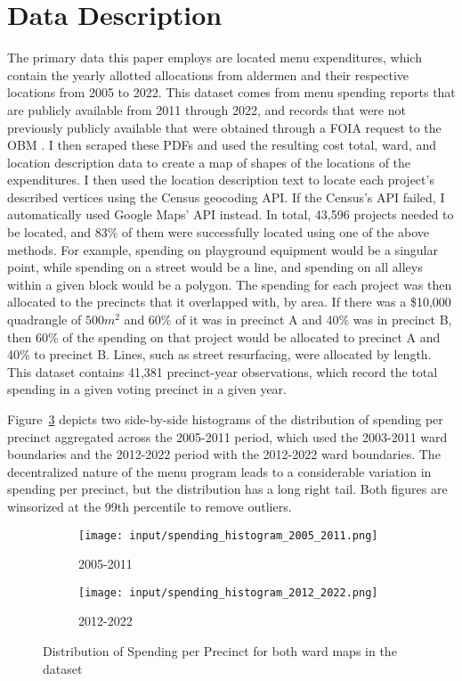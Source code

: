 \section{Data Description}\label{sec:data_description}
The primary data this paper employs are located menu expenditures, which contain the yearly allotted allocations from aldermen and their respective locations from 2005 to 2022.
This dataset comes from menu spending reports that are publicly available from 2011 through 2022, and records that were not previously publicly available that were obtained through a FOIA request to the OBM \cite{OBM_datasource}.  
I then scraped these PDFs and used the resulting cost total, ward, and location description data to create a map of shapes of the locations of the expenditures.
I then used the location description text to locate each project's described vertices using the Census geocoding API. 
If the Census's API failed, I automatically used Google Maps' API instead.
In total, 43,596 projects needed to be located, and 83\% of them were successfully located using one of the above methods.
For example, spending on playground equipment would be a singular point, while spending on a street would be a line, and spending on all alleys within a given block would be a polygon.
The spending for each project was then allocated to the precincts that it overlapped with, by area.
If there was a \$10,000 quadrangle of $500 m^2$ and 60\% of it was in precinct A and 40\% was in precinct B, then 60\% of the spending on that project would be allocated to precinct A and 40\% to precinct B.
Lines, such as street resurfacing, were allocated by length.
This dataset contains 41,381 precinct-year observations, which record the total spending in a given voting precinct in a given year.

Figure~\ref{fig:spending_hist} depicts two side-by-side histograms of the distribution of spending per precinct aggregated across the 2005-2011 period, which used the 2003-2011 ward boundaries and the 2012-2022 period with the 2012-2022 ward boundaries.
The decentralized nature of the menu program leads to a considerable variation in spending per precinct, but the distribution has a long right tail.
Both figures are winsorized at the 99th percentile to remove outliers.

\begin{figure}[H]
    \centering
    \begin{subfigure}[b]{0.45\textwidth} %
      \texttt{[image: input/spending\_histogram\_2005\_2011.png]}
      \caption{2005-2011}
      \label{fig:sub1}
    \end{subfigure}
    \hfill %
    \begin{subfigure}[b]{0.45\textwidth}
      \texttt{[image: input/spending\_histogram\_2012\_2022.png]}
      \caption{2012-2022}
      \label{fig:sub2}
    \end{subfigure}
  
    \caption{Distribution of Spending per Precinct for both ward maps in the dataset}
    \label{fig:spending_hist}
  \end{figure}

